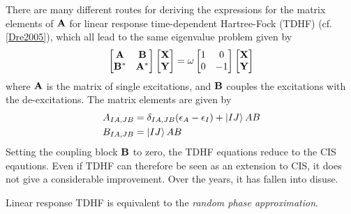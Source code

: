 There are many different routes for deriving the expressions for the matrix elements of $\mathbf{A}$ for linear response time-dependent Hartree-Fock (TDHF) (cf. \ref{Dre2005}), which all lead to the same eigenvalue problem given by 
\begin{equation}
\begin{bmatrix}
\mathbf{A} & \mathbf{B} \\
\mathbf{B}^* & \mathbf{A}^* 
\end{bmatrix} 
\begin{bmatrix}
\mathbf{X} \\
\mathbf{Y} 
\end{bmatrix}
= 
\omega 
\begin{bmatrix}
1 & 0 \\
0 & -1
\end{bmatrix}
\begin{bmatrix}
\mathbf{X} \\
\mathbf{Y} 
\end{bmatrix}
\label{eq:TDSCF}
\end{equation}
\noindent where $\mathbf{A}$ is the matrix of single excitations, and $\mathbf{B}$ couples the excitations with the de-excitations. The matrix elements are given by
\begin{align}
A_{IA,JB} &= \delta_{IA,JB} (\epsilon_A - \epsilon_I) + \ket{\smash{IJ}}{AB} \\
B_{IA,JB} &= \ket{\smash{IJ}}{AB}
\end{align}
\noindent Setting the coupling block $\mathbf{B}$ to zero, the TDHF equations reduce to the CIS eqautions. Even if TDHF can therefore be seen as an extension to CIS, it does not give a considerable improvement. Over the years, it has fallen into disuse.

Linear response TDHF is equivalent to the \emph{random phase approximation}. 


